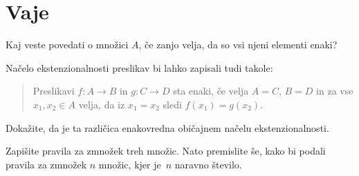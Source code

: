 



\section{Vaje}

\begin{vaja}
  Kaj veste povedati o množici $A$, če zanjo velja, da so vsi njeni elementi enaki?
\end{vaja}

\begin{vaja}
  Načelo ekstenzionalnosti preslikav bi lahko zapisali tudi takole:
  \begin{quote}
    Preslikavi $f : A \to B$ in $g : C \to D$ sta enaki, če velja $A = C$, $B = D$ in za
    vse $x_1, x_2 \in A$ velja, da iz $x_1 = x_2$ sledi $f(x_1) = g(x_2)$.
  \end{quote}
  Dokažite, da je ta različica enakovredna običajnem načelu ekstenzionalnosti.
\end{vaja}

\begin{vaja}
  Zapišite pravila za zmnožek treh množic. Nato premislite še, kako bi podali pravila za
  zmnožek $n$ množic, kjer je~$n$ naravno število.
\end{vaja}


